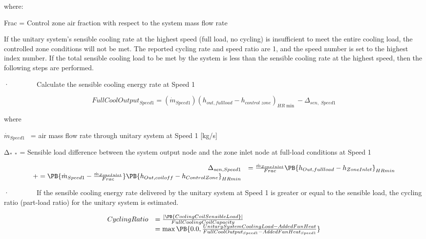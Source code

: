 where:

Frac = Control zone air fraction with respect to the system mass flow rate

If the unitary system's sensible cooling rate at the highest speed (full load, no cycling) is insufficient to meet the entire cooling load, the controlled zone conditions will not be met. The reported cycling rate and speed ratio are 1, and the speed number is set to the highest index number. If the total sensible cooling load to be met by the system is less than the sensible cooling rate at the highest speed, then the following steps are performed.

·~~~~~~~~Calculate the sensible cooling energy rate at Speed 1

\begin{equation}
FullCoolOutpu{t_{Speed1}} = ({\dot m_{Speed1}}){({h_{out,fullload}} - {h_{control\;zone}})_{HR\min }} - {\Delta_{sen,\;Speed1}}
\end{equation}

where

\emph{\({\dot m_{Speed1}}\)}~ = air mass flow rate through unitary system at Speed 1 {[}kg/s{]}

Δ\(_{*}\) \(_{*}\) = Sensible load difference between the system output node and the zone inlet node at full-load conditions at Speed 1

\begin{equation}
  \begin{array}{rl}
    \Delta_{sen,Speed1} &= \frac{\dot{m}_{ZoneInlet}}{Frac} \PB{h_{Out,full load} - h_{ZoneInlet}}_{HRmin} \\
                              += \PB{\dot{m}_{Speed1} - \frac{\dot{m}_{ZoneInlet}}{Frac}} \PB{h_{Out,coil off} - h_{ControlZone}}_{HRmin}
  \end{array}
\end{equation}

·~~~~~~~~If the sensible cooling energy rate delivered by the unitary system at Speed 1 is greater or equal to the sensible load, the cycling ratio (part-load ratio) for the unitary system is estimated.

\begin{equation}
  \begin{array}{rl}
    CyclingRatio &= \frac{ \left| \PB{CoolingCoilSensibleLoad} \right| } {FullCoolingCoilCapacity} \\ 
                 &= \max \PB{0.0,\frac{UnitarySystemCoolingLoad - AddedFanHeat}{FullCoolOutput_{Speed1} - AddedFanHeat_{Speed1}}}
  \end{array}
\end{equation}

